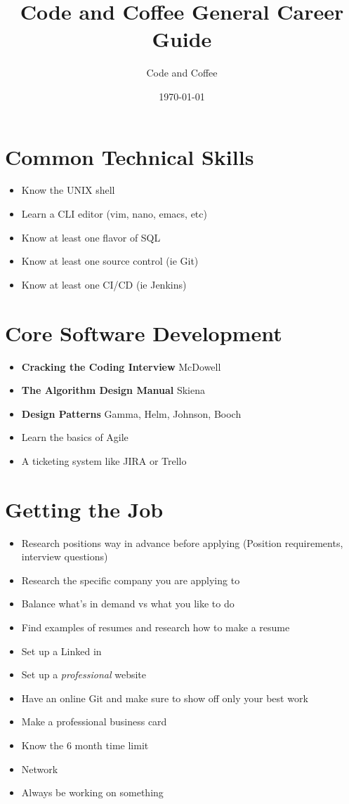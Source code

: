 \documentclass[12pt]{article}
\title{Code and Coffee General Career Guide}
\author{Code and Coffee}
\date{\today}
\begin{document}
\maketitle

\section{Common Technical Skills}
\begin{itemize}
\item Know the UNIX shell
\item Learn a CLI editor (vim, nano, emacs, etc)
\item Know at least one flavor of SQL
\item Know at least one source control (ie Git)
\item Know at least one CI/CD (ie Jenkins)
\end{itemize}

\section{Core Software Development}
\begin{itemize}
\item \textbf{Cracking the Coding Interview} McDowell
\item \textbf{The Algorithm Design Manual} Skiena
\item \textbf{Design Patterns} Gamma, Helm, Johnson, Booch
\item Learn the basics of Agile
\item A ticketing system like JIRA or Trello
\end{itemize}


\section{Getting the Job}
\begin{itemize}
\item Research positions way in advance before applying (Position requirements, interview questions)
\item Research the specific company you are applying to
\item Balance what's in demand vs what you like to do
\item Find examples of resumes and research how to make a resume
\item Set up a Linked in
\item Set up a \textit{professional} website
\item Have an online Git and make sure to show off only your best work
\item Make a professional business card
\item Know the 6 month time limit
\item Network
\item Always be working on something
\end{itemize}
\end{document}
